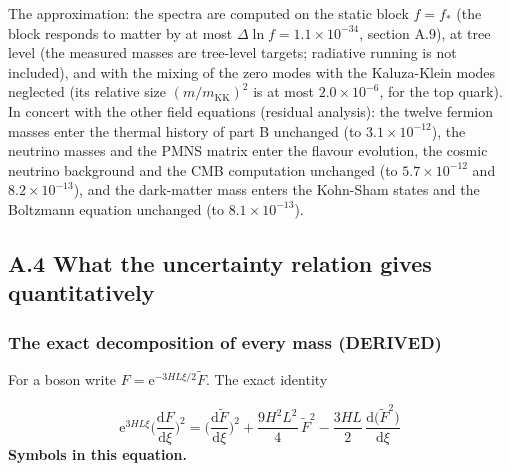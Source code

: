 \documentclass[
  10pt,
]{article}
\begin{document}
The approximation: the spectra are computed on the static block
\(f = f_*\) (the block responds to matter by at most
\(\Delta\ln f = 1.1\times10^{-34}\), section A.9), at tree level (the
measured masses are tree-level targets; radiative running is not
included), and with the mixing of the zero modes with the Kaluza-Klein
modes neglected (its relative size \((m/m_{\mathrm{KK}})^2\) is at most
\(2.0\times10^{-6}\), for the top quark). In concert with the other
field equations (residual analysis): the twelve fermion masses enter the
thermal history of part B unchanged (to \(3.1\times10^{-12}\)), the
neutrino masses and the PMNS matrix enter the flavour evolution, the
cosmic neutrino background and the CMB computation unchanged (to
\(5.7\times10^{-12}\) and \(8.2\times10^{-13}\)), and the dark-matter
mass enters the Kohn-Sham states and the Boltzmann equation unchanged
(to \(8.1\times10^{-13}\)).

\hypertarget{a.4-what-the-uncertainty-relation-gives-quantitatively}{%
\subsection*{A.4 What the uncertainty relation gives
quantitatively}\label{a.4-what-the-uncertainty-relation-gives-quantitatively}}

\hypertarget{the-exact-decomposition-of-every-mass-derived}{%
\subsubsection*{The exact decomposition of every mass
(DERIVED)}\label{the-exact-decomposition-of-every-mass-derived}}

For a boson write \(F = \mathrm{e}^{-3HL\xi/2}\tilde F\). The exact
identity

\[ \mathrm{e}^{3HL\xi}\Big(\frac{\mathrm{d}F}{\mathrm{d}\xi}\Big)^2 = \Big(\frac{\mathrm{d}\tilde F}{\mathrm{d}\xi}\Big)^2 + \frac{9H^2L^2}{4}\,\tilde F^2 - \frac{3HL}{2}\,\frac{\mathrm{d}\big(\tilde F^2\big)}{\mathrm{d}\xi} \]
\textbf{Symbols in this equation.}
\end{document}
